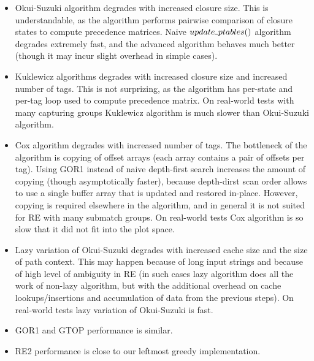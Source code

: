 \documentclass[AMA,STIX1COL]{WileyNJD-v2}
\newcommand{\Xund}{\rule{.4em}{.4pt}}
\begin{document}
\begin{itemize}[itemsep=0.5em]
    \item Okui-Suzuki algorithm degrades with increased closure size.
        This is understandable, as the algorithm performs pairwise comparison of closure states to compute precedence matrices.
        Naive $update \Xund ptables ()$ algorithm degrades extremely fast,
        and the advanced algorithm behaves much better (though it may incur slight overhead in simple cases).

    \item Kuklewicz algorithms degrades with increased closure size and increased number of tags.
        This is not surprizing, as the algorithm has per-state and per-tag loop used to compute precedence matrix.
        On real-world tests with many capturing groups Kuklewicz algorithm is much slower than Okui-Suzuki algorithm.

    \item Cox algorithm degrades with increased number of tags.
        The bottleneck of the algorithm is copying of offset arrays
        (each array contains a pair of offsets per tag).
        Using GOR1 instead of naive depth-first search increases the amount of copying (though asymptotically faster),
        because depth-dirst scan order allows to use a single buffer array that is updated and restored in-place.
        However, copying is required elsewhere in the algorithm,
        and in general it is not suited for RE with many submatch groups.
        On real-world tests Cox algorithm is so slow that it did not fit into the plot space.

    \item Lazy variation of Okui-Suzuki degrades with increased cache size and the size of path context.
        This may happen because of long input strings and because of high level of ambiguity in RE
        (in such cases lazy algorithm does all the work of non-lazy algorithm,
        but with the additional overhead on cache lookups/insertions and accumulation of data from the previous steps).
        On real-world tests lazy variation of Okui-Suzuki is fast.

    \item GOR1 and GTOP performance is similar.

    \item RE2 performance is close to our leftmost greedy implementation.
    \\[-0.5em]
\end{itemize}
\end{document}
